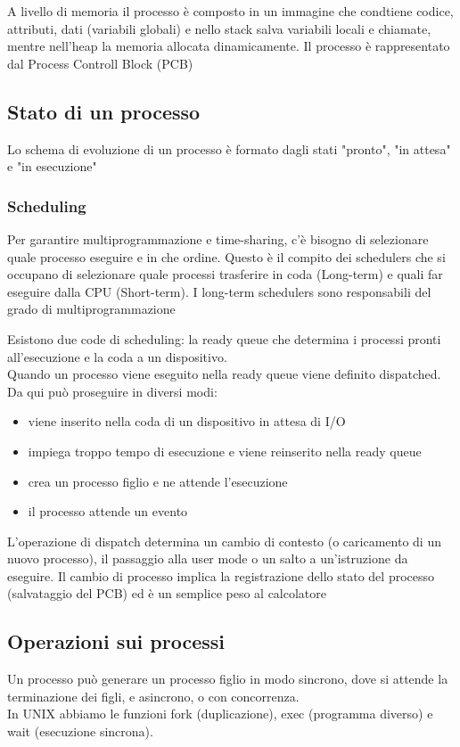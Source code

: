 \documentclass[12pt, a4paper]{article}
\begin{document}
A livello di memoria il processo è composto in un immagine che condtiene codice, attributi, dati (variabili globali)
e nello stack salva variabili locali e chiamate, mentre nell'heap la memoria allocata dinamicamente. Il processo è
rappresentato dal Process Controll Block (PCB)

\subsection{Stato di un processo}
Lo schema di evoluzione di un processo è formato dagli stati "pronto", "in attesa" e "in esecuzione"

\subsubsection{Scheduling}
Per garantire multiprogrammazione e time-sharing, c'è bisogno di selezionare quale processo eseguire e in che ordine.
Questo è il compito dei schedulers che si occupano di selezionare quale processi trasferire in 
coda (Long-term) e quali far eseguire dalla CPU (Short-term). I long-term schedulers sono responsabili del grado di 
multiprogrammazione

Esistono due code di scheduling: la ready queue che determina i processi pronti all'esecuzione e la coda a un 
dispositivo. \\Quando un processo viene eseguito nella ready queue viene definito dispatched. Da qui può proseguire 
in diversi modi:
\begin{itemize}
    \item viene inserito nella coda di un dispositivo in attesa di I/O
    \item impiega troppo tempo di esecuzione e viene reinserito nella ready queue
    \item crea un processo figlio e ne attende l'esecuzione
    \item il processo attende un evento
\end{itemize}

L'operazione di dispatch determina un cambio di contesto (o caricamento di un nuovo processo), il passaggio alla user
mode o un salto a un'istruzione da eseguire. Il cambio di processo implica la registrazione dello stato del processo
(salvataggio del PCB) ed è un semplice peso al calcolatore

\subsection{Operazioni sui processi}
Un processo può generare un processo figlio in modo sincrono, dove si attende la terminazione dei figli, e asincrono,
o con concorrenza.\\
In UNIX abbiamo le funzioni fork (duplicazione), exec (programma diverso) e wait (esecuzione sincrona).
\end{document}
